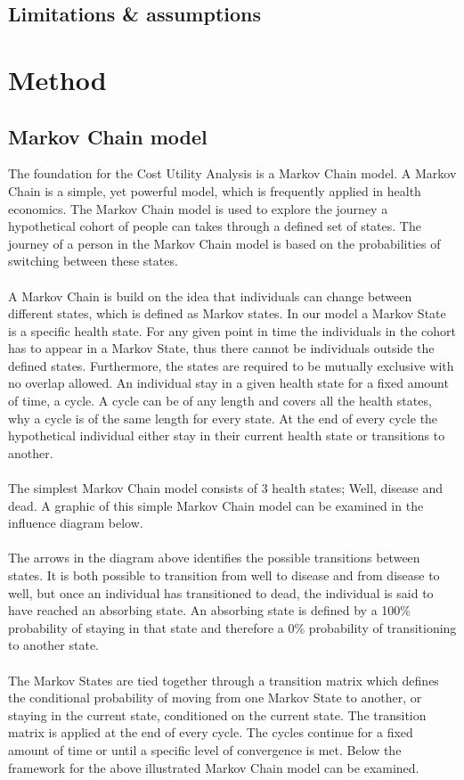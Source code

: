 \documentclass[a4paper,12pt]{article}
\begin{document}
\subsection{Limitations \& assumptions}

\section{Method}

\subsection{Markov Chain model}

The foundation for the Cost Utility Analysis is a Markov Chain model. A Markov Chain is a simple, yet powerful model, which is frequently applied in health economics. The Markov Chain model is used to explore the journey a hypothetical cohort of people can takes through a defined set of states. The journey of a person in the Markov Chain model is based on the probabilities of switching between these states.
\\\\
A Markov Chain is build on the idea that individuals can change between different states, which is defined as Markov states. In our model a Markov State is a specific health state. For any given point in time the individuals in the cohort has to appear in a Markov State, thus there cannot be individuals outside the defined states. Furthermore, the states are required to be mutually exclusive with no overlap allowed. An individual stay in a given health state for a fixed amount of time, a cycle. A cycle can be of any length and covers all the health states, why a cycle is of the same length for every state. At the end of every cycle the hypothetical individual either stay in their current health state or transitions to another.
\\\\
The simplest Markov Chain model consists of 3 health states; Well, disease and dead. A graphic of this simple Markov Chain model can be examined in the influence diagram below.
\\\\
The arrows in the diagram above identifies the possible transitions between states. It is both possible to transition from well to disease and from disease to well, but once an individual has transitioned to dead, the individual is said to have reached an absorbing state. An absorbing state is defined by a 100\% probability of staying in that state and therefore a 0\% probability of transitioning to another state. 
\\\\
The Markov States are tied together through a transition matrix which defines the conditional probability of moving from one Markov State to another, or staying in the current state, conditioned on the current state. The transition matrix is applied at the end of every cycle. The cycles continue for a fixed amount of time or until a specific level of convergence is met. Below the framework for the above illustrated Markov Chain model can be examined.
\end{document}
